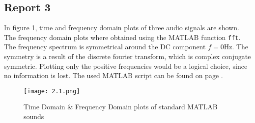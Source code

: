 \subsection*{Report 3}

	In figure \ref{figure:2_1}, time and frequency domain plots of three audio signals are shown. The frequency domain plots where obtained using the MATLAB function \verb+fft+. The frequency spectrum is symmetrical around the DC component $f = 0 \si{\hertz}$. The symmetry is a result of the discrete fourier transform, which is complex conjugate symmetric. Plotting only the positive frequencies would be a logical choice, since no information is lost. The used MATLAB script can be found on page \pageref{matlab_2.1}.

	\begin{figure}[H] 
		\centering
		\texttt{[image: 2.1.png]}
		\caption{Time Domain \& Frequency Domain plots of standard MATLAB sounds}
		\label{figure:2_1}
	\end{figure}

		